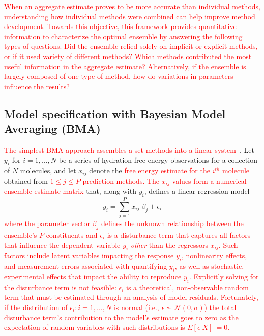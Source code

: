 \documentclass[journal=jpcbfk, manuscript=article]{achemso}
\newcommand{\+}[1]{\ensuremath{\mathbf{#1}}}
\newcommand{\rev}[1]{\textsf{\textcolor{red}{#1}}}
\begin{document}
\rev{When an aggregate estimate proves to be more accurate than individual methods, understanding how individual methods were combined can help improve method development.
Towards this objective, this framework provides quantitative information to characterize the optimal ensemble by answering the following types of questions.
Did the ensemble relied solely on implicit or explicit methods, or if it used variety of different methods?
Which methods contributed the most useful information in the aggregate estimate?
Alternatively, if the ensemble is largely composed of one type of method, how do variations in parameters influence the results?}

\subsection{Model specification with Bayesian Model Averaging (BMA)} \label{Method} 

\rev{The simplest BMA approach assembles a set methods into a linear system}~\cite{Hoeting:1999,Raftery:1998,Raftery:1995}.  
Let $y_i$ for $i = 1, \ldots, N$ be a series of hydration free energy observations for a collection of $N$ molecules, and let $x_{i j}$ denote the \rev{free energy estimate for the $i^{th}$ molecule} obtained from \rev{$1 \leq j \leq P$ prediction methods. 
The $x_{ij}$ values form a numerical ensemble estimate matrix} that, along with $y_i$, defines a linear regression model 
\begin{equation}
	\label{Method:E1}
	y_i = \sum_{j=1}^P x_{ij} \;\beta_j + \epsilon_i
\end{equation}
\rev{where the parameter vector $\beta_j$ defines the unknown relationship between the ensemble's $P$ constituents and $\epsilon_i$ is a disturbance term that captures all factors that influence the dependent variable $y_i$ \emph{other} than the regressors $x_{ij}$.
Such factors include latent variables impacting the response $y_i$, nonlinearity effects, and measurement errors associated with quantifying $y_i$, as well as stochastic, experimental effects that impact the ability to reproduce $y_i$.  
Explicitly solving for the disturbance term is not feasible: $\epsilon_i$ is a theoretical, non-observable random term that must be estimated through an analysis of model residuals.  
Fortunately, if the distribution of $\epsilon_i: i=1,\ldots,N$ is normal (i.e., $\epsilon \sim \mathcal{N}(0,\sigma)$) the total disturbance term's contribution to the model's estimate goes to zero as the expectation of random variables with such distributions is $E [\epsilon | X]\ = 0$.}
\end{document}
